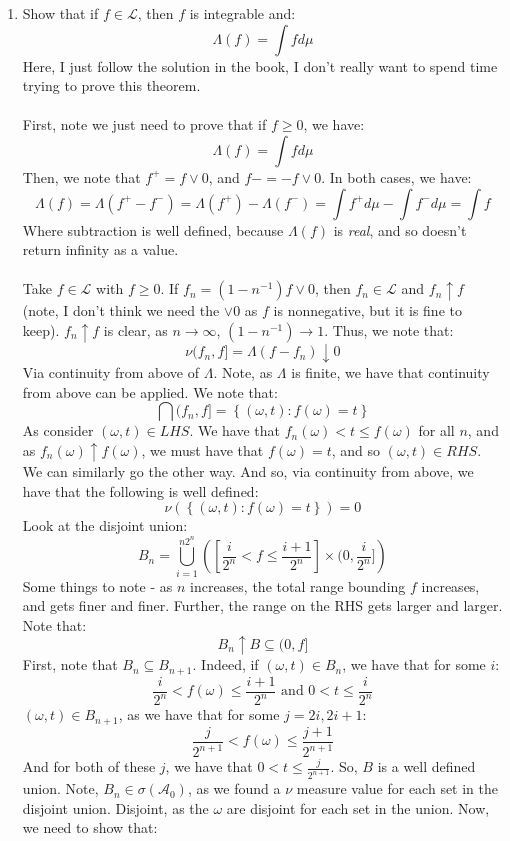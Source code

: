 \documentclass[12pt,a4paper]{article}
\newcommand{\1}[1]{\mathbbm{1}\left\{ #1 \right\}}
\newcommand{\acal}{\mathcal{A}}
\newcommand{\lcal}{\mathcal{L}}
\begin{document}
\begin{enumerate}
	\item Show that if $f \in \lcal$, then $f$ is integrable and:
	$$
		\Lambda(f) = \int f d\mu
	$$
	Here, I just follow the solution in the book, I don't really want to spend time trying to prove this theorem. 
	\\\\
	First, note we just need to prove that if $f \geq 0$, we have:
	$$
		\Lambda(f) = \int f d\mu
	$$
	Then, we note that $f^+ = f \vee 0$, and $f- = -f \vee 0$. In both cases, we have:
	$$
		\Lambda(f) = \Lambda(f^+ - f^-) = \Lambda(f^+) - \Lambda(f^-) =
		\int f^+ d\mu - \int f^- d\mu = \int f
	$$
	Where subtraction is well defined, because $\Lambda(f)$ is \textit{real}, and so doesn't return infinity as a value.
	\\\\
	Take $f \in \lcal$ with $f \geq 0$. If $f_n = (1 - n^{-1})f \vee 0$, then $f_n \in \lcal$ and $f_n \uparrow f$ (note, I don't think we need the $\vee 0$ as $f$ is nonnegative, but it is fine to keep). $f_n \uparrow f$ is clear, as $n \to \infty$, $(1 - n^{-1}) \to 1$. Thus, we note that:
	$$
		\nu(f_n,f] = \Lambda(f - f_n) \downarrow 0
	$$
	Via continuity from above of $\Lambda$. Note, as $\Lambda$ is finite, we have that continuity from above can be applied. We note that:
	$$
		\bigcap (f_n,f] = \left\{(\omega, t) : f(\omega) = t\right\}
	$$
	As consider $(\omega, t) \in LHS$. We have that $f_n(\omega) < t \leq f(\omega)$ for all $n$, and as $f_n(\omega) \uparrow f(\omega)$, we must have that $f(\omega) = t$, and so $(\omega, t) \in RHS$. We can similarly go the other way. And so, via continuity from above, we have that the following is well defined:
	$$
		\nu\left(\left\{(\omega, t) : f(\omega) = t\right\}\right) = 0
	$$
	Look at the disjoint union:
	$$
		B_n = \bigcup_{i=1}^{n2^n} 
		\left(\left[\frac{i}{2^n} < f \leq \frac{i+1}{2^n}\right] \times \bigg(0, \frac{i}{2^n}\bigg]\right)
	$$
	Some things to note - as $n$ increases, the total range bounding $f$ increases, and gets finer and finer. Further, the range on the RHS gets larger and larger. Note that:
	$$
		B_n \uparrow B \subseteq (0,f]
	$$
	First, note that $B_n \subseteq B_{n+1}$. Indeed, if $(\omega, t) \in B_n$, we have that for some $i$:
	$$
		\frac{i}{2^n} < f(\omega) \leq \frac{i+1}{2^n} \text{ and } 0 < t \leq \frac{i}{2^n}
	$$
	$(\omega, t) \in B_{n+1}$, as we have that for some $j = 2i, 2i+1$:
	$$
		\frac{j}{2^{n+1}} < f(\omega) \leq \frac{j+1}{2^{n+1}}
	$$
	And for both of these $j$, we have that $0 < t \leq \frac{j}{2^{n+1}}$. So, $B$ is a well defined union. Note, $B_n \in \sigma(\acal_0)$, as we found a $\nu$ measure value for each set in the disjoint union. Disjoint, as the $\omega$ are disjoint for each set in the union. Now, we need to show that:

\end{enumerate}
\end{document}
